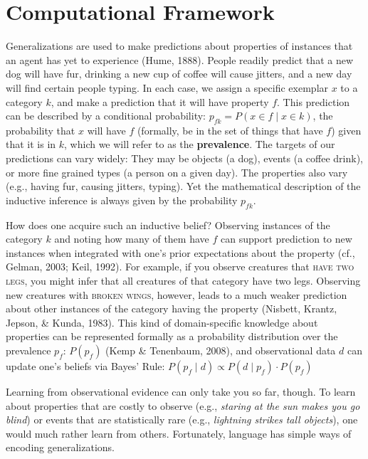 \documentclass[english,floatsintext,man]{apa6}
\theoremstyle{definition}
\theoremstyle{definition}
\theoremstyle{definition}
\theoremstyle{remark}
\begin{document}
\section{Computational Framework}\label{computational-framework}

Generalizations are used to make predictions about properties of
instances that an agent has yet to experience (Hume, 1888). People
readily predict that a new dog will have fur, drinking a new cup of
coffee will cause jitters, and a new day will find certain people
typing. In each case, we assign a specific exemplar \(x\) to a category
\(k\), and make a prediction that it will have property \(f\). This
prediction can be described by a conditional probability:
\(p_{fk} = P(x \in f \mid x \in k)\), the probability that \(x\) will
have \(f\) (formally, be in the set of things that have \(f\)) given
that it is in \(k\), which we will refer to as the \textbf{prevalence}.
The targets of our predictions can vary widely: They may be objects (a
dog), events (a coffee drink), or more fine grained types (a person on a
given day). The properties also vary (e.g., having fur, causing jitters,
typing). Yet the mathematical description of the inductive inference is
always given by the probability \(p_{fk}\).

How does one acquire such an inductive belief? Observing instances of
the category \(k\) and noting how many of them have \(f\) can support
prediction to new instances when integrated with one's prior
expectations about the property (cf., Gelman, 2003; Keil, 1992). For
example, if you observe creatures that \textsc{have two legs}, you might
infer that all creatures of that category have two legs. Observing new
creatures with \textsc{broken wings}, however, leads to a much weaker
prediction about other instances of the category having the property
(Nisbett, Krantz, Jepson, \& Kunda, 1983). This kind of domain-specific
knowledge about properties can be represented formally as a probability
distribution over the prevalence \(p_{f}\): \(P(p_{f})\) (Kemp \&
Tenenbaum, 2008), and observational data \(d\) can update one's beliefs
via Bayes' Rule:
\(P(p_{f} \mid d) \propto P(d \mid p_{f}) \cdot P(p_{f})\)

Learning from observational evidence can only take you so far, though.
To learn about properties that are costly to observe (e.g.,
\emph{staring at the sun makes you go blind}) or events that are
statistically rare (e.g., \emph{lightning strikes tall objects}), one
would much rather learn from others. Fortunately, language has simple
ways of encoding generalizations.
\end{document}
